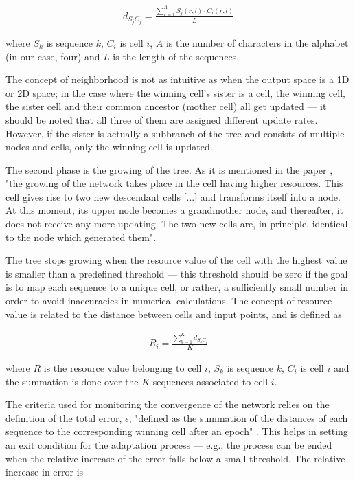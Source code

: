 \documentclass[11pt,twocolumn]{article}
\begin{document}
\begin{align}
d_{S_j C_j} = \frac{\sum_{r = 1}^A S_j(r, l) \cdot C_i(r, l)}{L}
\end{align}

where $S_k$ is sequence $k$, $C_i$ is cell $i$, $A$ is the number of characters in the alphabet (in our case, four) and $L$ is the length of the sequences.

The concept of neighborhood is not as intuitive as when the output space is a 1D or 2D space; in the case where the winning cell's sister is a cell, the winning cell, the sister cell and their common ancestor (mother cell) all get updated — it should be noted that all three of them are assigned different update rates. However, if the sister is actually a subbranch of the tree and consists of multiple nodes and cells, only the winning cell is updated.

The second phase is the growing of the tree. As it is mentioned in the paper \cite{Dopazo1997}, "the growing of the network takes place in the cell having higher resources. This cell gives rise to two new descendant cells [...] and transforms itself into a node. At this moment, its upper node becomes a grandmother node, and thereafter, it does not receive any more updating. The two new cells are, in principle, identical to the node which generated them".

The tree stops growing when the resource value of the cell with the highest value is smaller than a predefined threshold — this threshold should be zero if the goal is to map each sequence to a unique cell, or rather, a sufficiently small number in order to avoid inaccuracies in numerical calculations. The concept of resource value is related to the distance between cells and input points, and is defined as

\begin{align}
R_i = \frac{\sum_{k = 1}^K d_{S_k C_i}}{K}
\end{align}

where $R$ is the resource value belonging to cell $i$, $S_k$ is sequence $k$, $C_i$ is cell $i$ and the summation is done over the $K$ sequences associated to cell $i$.

The criteria used for monitoring the convergence of the network relies on the definition of the total error, $\epsilon$, "defined as the summation of the distances of each sequence to the corresponding winning cell after an epoch" \cite{Dopazo1997}. This helps in setting an exit condition for the adaptation process — e.g., the process can be ended when the relative increase of the error falls below a small threshold. The relative increase in error is
\end{document}
